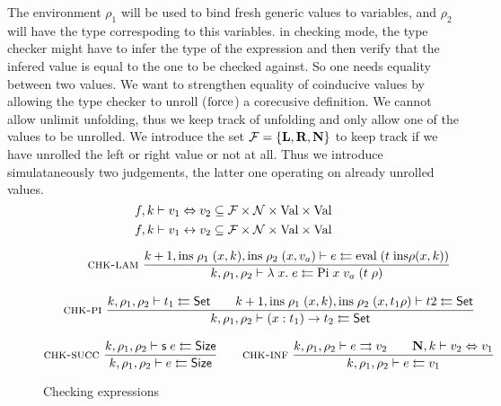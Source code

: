 The environment $\rho_1$ will be used to bind fresh generic values to variables, and $\rho_2$ will have the type correspoding to this variables. in checking mode, the type checker might have to infer the type of the expression and then verify that the infered value is equal to the one to be checked against.
So one needs equality between two values.
We want to strengthen equality of coinducive values by allowing the type checker to unroll ($\mathrm{force}$) a corecusive definition. We cannot allow unlimit unfolding, thus we keep track of unfolding and only allow one of the values to be unrolled.
We introduce the set $ \mathcal{F} = \{\mathbf{L}, \mathbf{R}, \mathbf{N} \} $ to keep track if we have unrolled the left or right value or not at all.
Thus we introduce simulataneously two judgements, the latter one operating on already unrolled values.
\[f,k\vdash v_1\Leftrightarrow v_2 \subseteq \mathcal{F} \times \mathcal{N} \times \mathrm{Val} \times \mathrm{Val} \]
\[f,k\vdash v_1{\;\leftrightarrow\;}v_2 \subseteq \mathcal{F} \times \mathcal{N} \times\mathrm{Val} \times \mathrm{Val} \]

\begin{figure}[p]

\begin{gather*}
\mbox{\sc chk-lam}\ \dfrac{k+1,\mathrm{ins} \; \rho_1 \; (x,k),\mathrm{ins} \; \rho_2 \; (x,v_a)\vdash e\leftleftarrows\mathrm{eval} \; (t \; \mathrm{ins} \rho (x,k))}{k,\rho_1,\rho_2\vdash\lambda\; x .\;{e}\leftleftarrows\mathrm{Pi} \; x \; v_a \; (t \; \rho)}
\\[2ex]
\mbox{\sc chk-pi}\ \dfrac{k,\rho_1,\rho_2\vdash t_1\leftleftarrows\mathsf{Set}
\qquad
k+1,\mathrm{ins} \; \rho_1 \; (x,k),\mathrm{ins} \; \rho_2 \; (x, t_1 \rho)\vdash t2\leftleftarrows\mathsf{Set}
}{k,\rho_1,\rho_2\vdash( x : t_1 ) \rightarrow{t_2}\leftleftarrows\mathsf{Set}}
\\[2ex]
\mbox{\sc chk-succ}\ \dfrac{k,\rho_1,\rho_2\vdash\mathsf{s}\; e\leftleftarrows\mathsf{Size}}{k,\rho_1,\rho_2\vdash e\leftleftarrows\mathsf{Size}}
\qquad
\mbox{\sc chk-inf}\ \dfrac{k,\rho_1,\rho_2\vdash e\rightrightarrows v_2
\qquad
\mathbf{N},k\vdash v_2\Leftrightarrow v_1}{k,\rho_1,\rho_2\vdash e\leftleftarrows v_1}
\end{gather*}
\caption{Checking expressions}
\end{figure}

